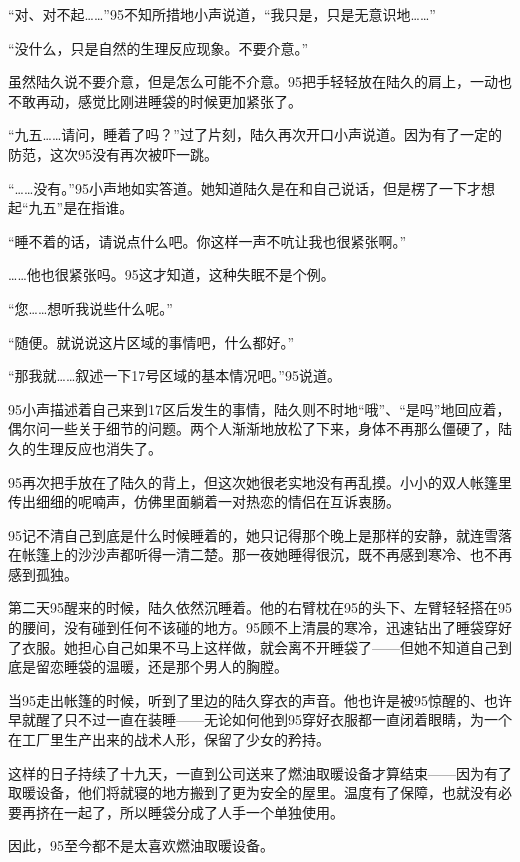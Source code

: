 “对、对不起……”95不知所措地小声说道，“我只是，只是无意识地……”

“没什么，只是自然的生理反应现象。不要介意。”

虽然陆久说不要介意，但是怎么可能不介意。95把手轻轻放在陆久的肩上，一动也不敢再动，感觉比刚进睡袋的时候更加紧张了。

“九五……请问，睡着了吗？”过了片刻，陆久再次开口小声说道。因为有了一定的防范，这次95没有再次被吓一跳。

“……没有。”95小声地如实答道。她知道陆久是在和自己说话，但是楞了一下才想起“九五”是在指谁。

“睡不着的话，请说点什么吧。你这样一声不吭让我也很紧张啊。”

……他也很紧张吗。95这才知道，这种失眠不是个例。

“您……想听我说些什么呢。”

“随便。就说说这片区域的事情吧，什么都好。”

“那我就……叙述一下17号区域的基本情况吧。”95说道。

95小声描述着自己来到17区后发生的事情，陆久则不时地“哦”、“是吗”地回应着，偶尔问一些关于细节的问题。两个人渐渐地放松了下来，身体不再那么僵硬了，陆久的生理反应也消失了。

95再次把手放在了陆久的背上，但这次她很老实地没有再乱摸。小小的双人帐篷里传出细细的呢喃声，仿佛里面躺着一对热恋的情侣在互诉衷肠。

95记不清自己到底是什么时候睡着的，她只记得那个晚上是那样的安静，就连雪落在帐篷上的沙沙声都听得一清二楚。那一夜她睡得很沉，既不再感到寒冷、也不再感到孤独。

第二天95醒来的时候，陆久依然沉睡着。他的右臂枕在95的头下、左臂轻轻搭在95的腰间，没有碰到任何不该碰的地方。95顾不上清晨的寒冷，迅速钻出了睡袋穿好了衣服。她担心自己如果不马上这样做，就会离不开睡袋了——但她不知道自己到底是留恋睡袋的温暖，还是那个男人的胸膛。

当95走出帐篷的时候，听到了里边的陆久穿衣的声音。他也许是被95惊醒的、也许早就醒了只不过一直在装睡——无论如何他到95穿好衣服都一直闭着眼睛，为一个在工厂里生产出来的战术人形，保留了少女的矜持。

这样的日子持续了十九天，一直到公司送来了燃油取暖设备才算结束——因为有了取暖设备，他们将就寝的地方搬到了更为安全的屋里。温度有了保障，也就没有必要再挤在一起了，所以睡袋分成了人手一个单独使用。

因此，95至今都不是太喜欢燃油取暖设备。

\section*{}

